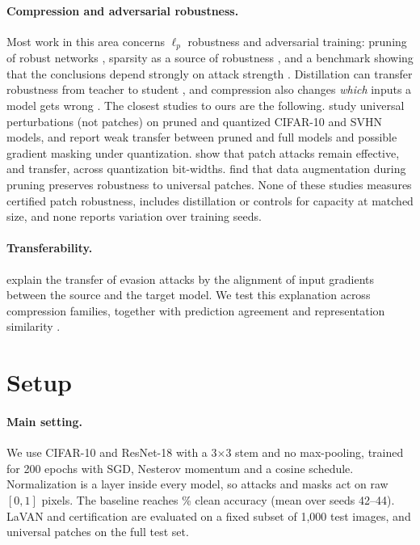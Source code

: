 \documentclass[10pt]{article}
\newcommand{\x}{$\times$}
\begin{document}
\paragraph{Compression and adversarial robustness.} Most work in this area concerns $\ell_p$ robustness and adversarial
training: pruning of robust networks \citep{ye2019adversarial,sehwag2020hydra}, sparsity as a source of robustness
\citep{liao2022achieving}, and a benchmark showing that the conclusions depend strongly on attack strength
\citep{piras2024adversarial}. Distillation can transfer robustness from teacher to student
\citep{goldblum2020adversarially}, and compression also changes \emph{which} inputs a model gets wrong
\citep{hooker2019compressed}. The closest studies to ours are the following. \citet{matachana2021robustness} study universal
perturbations (not patches) on pruned and quantized CIFAR-10 and SVHN models, and report weak transfer between pruned and
full models and possible gradient masking under quantization. \citet{guesmi2024exploring} show that patch attacks remain
effective, and transfer, across quantization bit-widths. \citet{gritsch2024preserving} find that data augmentation during
pruning preserves robustness to universal patches. None of these studies measures certified patch robustness, includes
distillation or controls for capacity at matched size, and none reports variation over training seeds.

\paragraph{Transferability.} \citet{demontis2019adversarial} explain the transfer of evasion attacks by the alignment of
input gradients between the source and the target model. We test this explanation across compression families, together
with prediction agreement and representation similarity \citep{kornblith2019similarity}.

\section{Setup}
\label{sec:setup}

\paragraph{Main setting.} We use CIFAR-10 \citep{krizhevsky2009learning} and ResNet-18 \citep{he2016deep} with a 3\x3 stem
and no max-pooling, trained for 200 epochs with SGD, Nesterov momentum and a cosine schedule. Normalization is a layer
inside every model, so attacks and masks act on raw $[0,1]$ pixels. The baseline reaches \% clean
accuracy (mean over seeds 42--44). LaVAN and certification are evaluated on a fixed subset of 1{,}000 test images, and
universal patches on the full test set.
\end{document}
